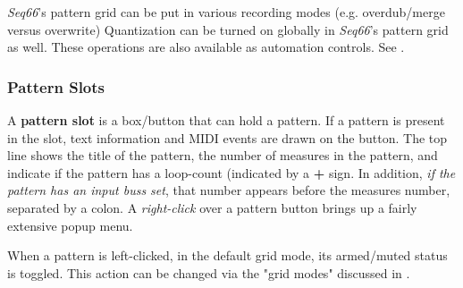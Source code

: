    \textsl{Seq66}'s pattern grid can be put in various recording
   modes (e.g. overdub/merge versus overwrite)
   Quantization can be turned on globally in \textsl{Seq66}'s pattern grid
   as well.
   These operations are also available as automation controls.
   See .


\subsubsection{Pattern Slots}
\label{subsubsec:patterns_pattern_slot}

   A \textbf{pattern slot} is a box/button that can hold a pattern.
   If a pattern is present in the slot, text information and MIDI
   events are drawn on the button.
   The top line shows
   the title of the pattern, the number of measures in the pattern, and
   indicate if the pattern has a loop-count (indicated by a \textbf{+} sign.
   In addition, \textsl{if the pattern has an input buss set}, that number
   appears before the measures number, separated by a colon.
   A \textsl{right-click} over a pattern button brings up a fairly extensive
   popup menu.

   When a pattern is left-clicked, in the default grid mode,
   its armed/muted status is toggled.
   This action can be changed via the "grid modes" discussed in
   .

%

